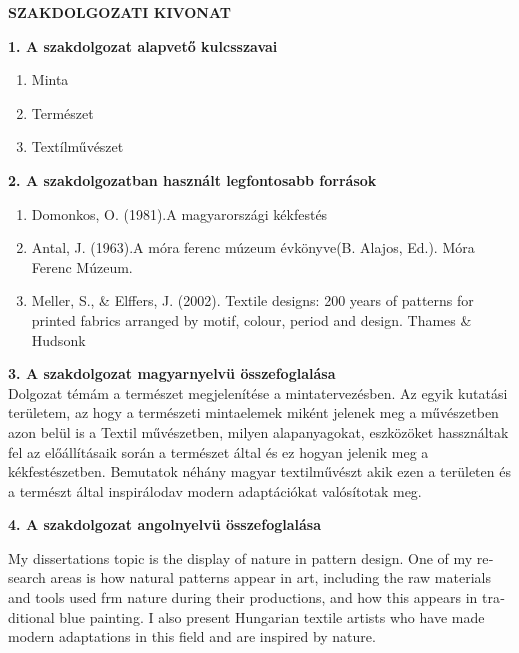 \thispagestyle{plain}
\begin{center}
    \Large
    \textbf{SZAKDOLGOZATI KIVONAT}
\end{center}
\textbf{1. A szakdolgozat alapvető kulcsszavai}
\begin{enumerate}[label=\alph*)]
	\item Minta
	\item Természet
	\item Textílművészet
\end{enumerate}
\textbf{2. A szakdolgozatban használt legfontosabb források}
\begin{enumerate}[label=\alph*)]
	\item Domonkos, O. (1981).A magyarországi kékfestés
	\item Antal, J. (1963).A móra ferenc múzeum évkönyve(B. Alajos, Ed.). Móra Ferenc Múzeum.
	\item Meller, S., \& Elffers, J. (2002). Textile designs: 200 years of patterns for printed fabrics arranged by motif, colour, period and design. Thames \& Hudsonk
\end{enumerate}
\newpage
\textbf{3. A szakdolgozat magyarnyelvü összefoglalása}
\vspace{0.2 cm}
\\
Dolgozat témám a természet megjelenítése a mintatervezésben.
Az egyik kutatási területem, az hogy a természeti mintaelemek miként jelenek meg a művészetben azon belül is a Textil művészetben, milyen alapanyagokat, eszközöket  hassználtak fel az előállításaik során a természet által és ez hogyan jelenik meg a kékfestészetben.
Bemutatok néhány magyar textilművészt akik ezen a területen és a természt által inspirálodav modern adaptációkat valósítotak meg.

\vspace{2 cm}

\textbf{4. A szakdolgozat angolnyelvü összefoglalása}
\vspace{0.2 cm}
\\
\begin{otherlanguage}{english}
My dissertations topic is the display of nature in pattern design.
One of my research areas is how natural patterns  appear in art, including the raw materials and tools used frm nature during their productions, and how this appears in traditional blue painting.
I also present Hungarian textile artists who have made modern adaptations in this field and are inspired by nature. 
\end{otherlanguage}
\newpage